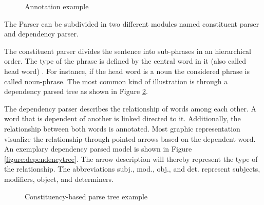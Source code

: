 \begin{figure}[h]
	\centering
	\caption{Annotation example}
	\label{figure:nlppipelineexample}
\end{figure}

The Parser can be subdivided in two different modules named constituent parser and dependency parser. 

The constituent parser divides the sentence into sub-phrases in an hierarchical order. The type of the phrase is defined by the central word in it (also called head word) \citep{jurafsky2014speech}. For instance, if the head word is a noun the considered phrase is called noun-phrase. The most common kind of illustration is through a dependency parsed tree as shown in Figure \ref{figure:constituencytree}.

The dependency parser describes the relationship of words among each other. A word that is dependent of another is linked directed to it. Additionally, the relationship between both words is annotated. Most graphic representation visualize the relationship through pointed arrows based on the dependent word. An exemplary dependency parsed model is shown in Figure \ref{figure:dependencytree}. The arrow description will thereby represent the type of the relationship. The abbreviations subj., mod., obj., and det. represent subjects, modifiers, object, and determiners.

\begin{figure}[h]
	\centering
	\caption{Constituency-based parse tree example}
	\label{figure:constituencytree}
\end{figure}

